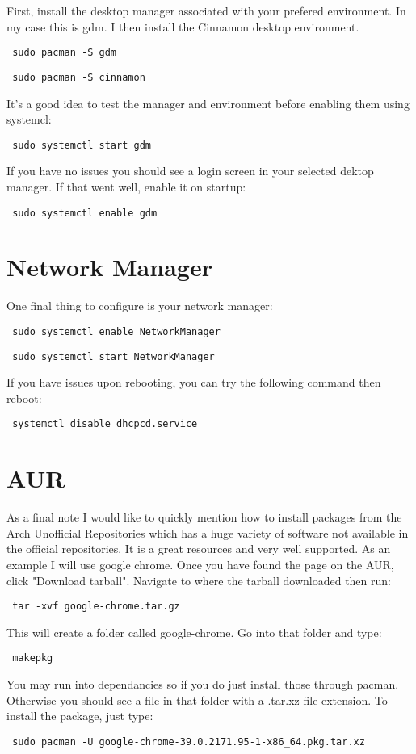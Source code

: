 \documentclass[12pt]{article}
\begin{document}
    First, install the desktop manager associated with your prefered
    environment. In my case this is gdm. I then install the Cinnamon desktop
    environment.
    \begin{verbatim} sudo pacman -S gdm \end{verbatim}
    \begin{verbatim} sudo pacman -S cinnamon \end{verbatim}
    It's a good idea to test the manager and environment before enabling them
    using systemcl:
    \begin{verbatim} sudo systemctl start gdm \end{verbatim}
    If you have no issues you should see a login screen in your selected dektop
    manager. If that went well, enable it on startup:
    \begin{verbatim} sudo systemctl enable gdm \end{verbatim}

\section*{Network Manager}
    One final thing to configure is your network manager:
    \begin{verbatim} sudo systemctl enable NetworkManager \end{verbatim}
    \begin{verbatim} sudo systemctl start NetworkManager \end{verbatim}
    If you have issues upon rebooting, you can try the following command then
    reboot:
    \begin{verbatim} systemctl disable dhcpcd.service \end{verbatim}

\section*{AUR}
    As a final note I would like to quickly mention how to install packages
    from the Arch Unofficial Repositories which has a huge variety of software
    not available in the official repositories. It is a great resources and
    very well supported.
    As an example I will use google chrome. Once you have found the page on the
    AUR, click "Download tarball". Navigate to where the tarball downloaded
    then run:
    \begin{verbatim} tar -xvf google-chrome.tar.gz \end{verbatim}
    This will create a folder called google-chrome. Go into that folder and
    type:
    \begin{verbatim} makepkg \end{verbatim}
    You may run into dependancies so if you do just install those through
    pacman. Otherwise you should see a file in that folder with a .tar.xz file
    extension. To install the package, just type:
    \begin{verbatim} sudo pacman -U google-chrome-39.0.2171.95-1-x86_64.pkg.tar.xz \end{verbatim}
\end{document}
